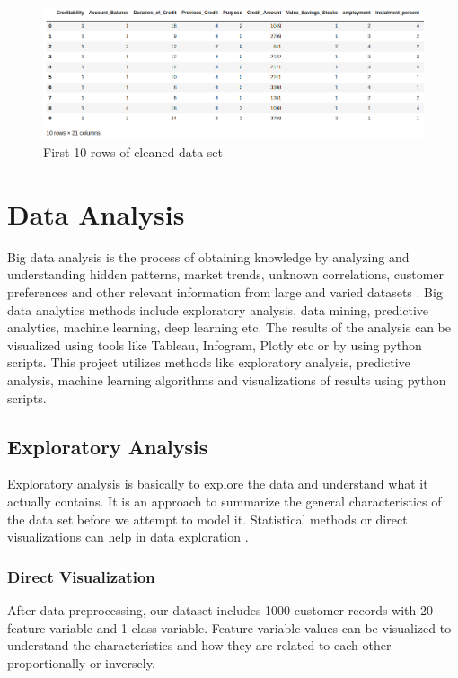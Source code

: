 \documentclass[sigconf]{acmart}
\begin{document}
\begin{figure}[htb]
  \centering
  \includegraphics[width=1.0\columnwidth]{project/images/Figure3.png}
  \caption{First 10 rows of cleaned data set
  \cite{psu-site}}
  \label{fig:Figure3} 
\end{figure}


\section{Data Analysis}

Big data analysis is the process of obtaining knowledge by analyzing and understanding hidden patterns, market trends, unknown correlations, customer preferences and other relevant information from large and varied datasets \cite{bigdata-analytics}. Big data analytics methods include exploratory analysis, data mining, predictive analytics, machine learning, deep learning etc. The results of the analysis can be visualized using tools like Tableau, Infogram, Plotly etc or by using python scripts. This project utilizes methods like exploratory analysis, predictive analysis, machine learning algorithms and visualizations of results using python scripts.

\subsection{Exploratory Analysis}

Exploratory analysis is basically to explore the data and understand what it actually contains. It is an approach to summarize the general characteristics of the data set before we attempt to model it. Statistical methods or direct visualizations can help in data exploration \cite{exploratory-analysis}. 

\subsubsection{Direct Visualization}

After data preprocessing, our dataset includes 1000 customer records with 20 feature variable and 1 class variable. Feature variable values can be visualized to understand the characteristics and how they are related to each other - proportionally or inversely. 
\end{document}
